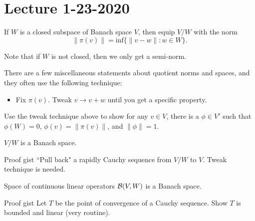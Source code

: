 \section{Lecture 1-23-2020}
\begin{dfn}
    If $W$ is a closed subspace of Banach space $V$, then equip $V/W$ with the norm
    \[
        \|\pi(v)\| = \text{inf}\{\|v-w\|: w \in W\}.
    \]
\end{dfn}
\begin{remark}
    Note that if $W$ is not closed, then we only get a semi-norm.
\end{remark}
There are a few miscellaneous statements about quotient norms and spaces, and they often use the following technique:
\begin{itemize}
    \item Fix $\pi(v)$. Tweak $v \rightarrow v + w$ until you get a specific property.
\end{itemize}
\begin{exercise}
    Use the tweak technique above to show for any $v \in V$, there is a $\phi \in V'$ such that $\phi(W) = 0$, $\phi(v) = \|\pi(v)\|$, and $\|\phi\| = 1$.
\end{exercise}

\begin{thm}
    $V/W$ is a Banach space.
\end{thm}
\begin{details}{Proof gist}
    ``Pull back" a rapidly Cauchy sequence from $V/W$ to $V$. Tweak technique is needed.
\end{details}
\begin{thm}
    Space of continuous linear operators ${\mathcal B}(V, W)$ is a Banach space.
\end{thm}
\begin{details}{Proof gist}
    Let $T$ be the point of convergence of a Cauchy sequence. Show $T$ is bounded and linear (very routine).
\end{details}
